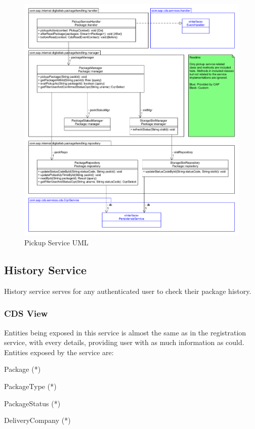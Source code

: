 \begin{figure}[H]
    \centering
    \includegraphics[width=1\linewidth]{images/service_class_diagrams/pickup_service_class_diagram.png}
    \caption{Pickup Service UML}
    \label{fig:pickup_service_uml}
\end{figure}
\pagebreak

\subsection{History Service}
History service serves for any authenticated user to check their package history.

\subsubsection{CDS View}

Entities being exposed in this service is almost the same as in the registration service, with every details, providing user with as much information as could. Entities exposed by the service are:
\begin{compactenum}
	\item Package (*)
    \item PackageType (*)
    \item PackageStatus (*)
    \item DeliveryCompany (*)
\end{compactenum}

